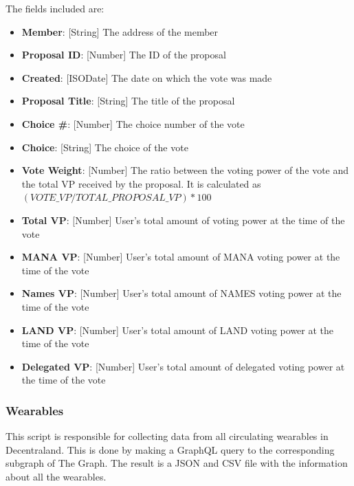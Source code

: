 \documentclass[MSE,Master,english]{twbook}%
\begin{document}
The fields included are:
\begin{itemize}
  \item \textbf{Member}: [String] The address of the member
  \item \textbf{Proposal ID}: [Number] The ID of the proposal
  \item \textbf{Created}: [ISODate] The date on which the vote was made
  \item \textbf{Proposal Title}: [String] The title of the proposal
  \item \textbf{Choice \#}: [Number] The choice number of the vote
  \item \textbf{Choice}: [String] The choice of the vote
  \item \textbf{Vote Weight}: [Number] The ratio between the voting power of the vote and the total VP received by the proposal. It is calculated as $(VOTE\_VP / TOTAL\_PROPOSAL\_VP) * 100$
  \item \textbf{Total VP}: [Number] User's total amount of voting power at the time of the vote
  \item \textbf{MANA VP}: [Number] User's total amount of MANA voting power at the time of the vote
  \item \textbf{Names VP}: [Number] User's total amount of NAMES voting power at the time of the vote
  \item \textbf{LAND VP}: [Number] User's total amount of LAND voting power at the time of the vote
  \item \textbf{Delegated VP}: [Number] User's total amount of delegated voting power at the time of the vote
\end{itemize}

\subsubsection{Wearables}
This script is responsible for collecting data from all circulating wearables in Decentraland. This is done by making a GraphQL query to the corresponding subgraph of The Graph. The result is a JSON and CSV file with the information about all the wearables. \\
\end{document}
